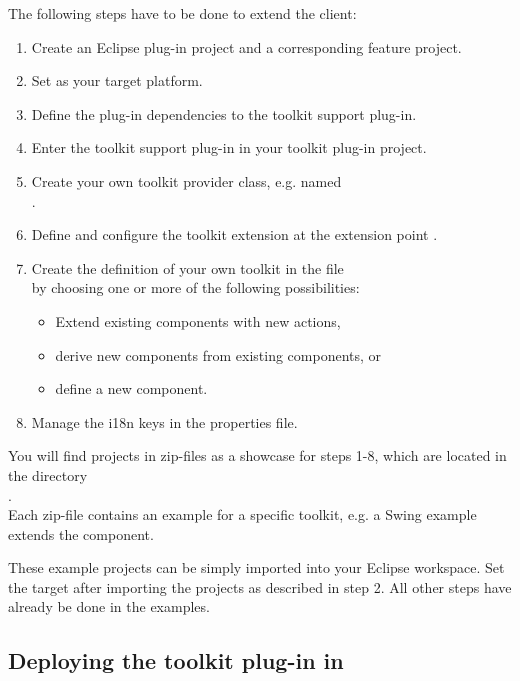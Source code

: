 The following steps have to be done to extend the \app{} client:
\begin{enumerate}
 \item Create an Eclipse plug-in project and a corresponding feature project.
 \item Set  as your
 target platform.
 \item Define the plug-in dependencies to the toolkit support plug-in.
 \item Enter the toolkit support plug-in in your toolkit plug-in project.
 \item Create your own toolkit provider class, e.g. named\\
 .
 \item Define and configure the toolkit extension at the extension point
 .
 \item Create the definition of your own toolkit in the file\\
  by choosing one or more of the following
 possibilities:
 \begin{itemize}
  \item Extend existing \app{} components with new actions,
  \item derive new components from existing \app{} components, or
  \item define a new component.
 \end{itemize}
 \item Manage the i18n keys in the properties file.
\end{enumerate}

You will find projects in zip-files as a showcase for steps 1-8, which are
located in the directory\\
.\\
Each zip-file contains an example for a specific toolkit, e.g. a Swing example
extends the  component.

These example projects can be simply imported into your Eclipse workspace. Set
the target after importing the projects as described in step 2. All other steps
have already be done in the examples.

\subsection{Deploying the toolkit plug-in in \app{}}

